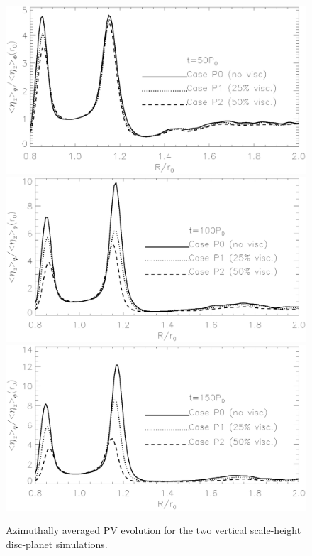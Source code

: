 \begin{figure}
  \centering
  \includegraphics[width=\linewidth,clip=true,trim=0cm 1.66cm 0cm
    0.6cm]{figures/pdisk_vorten1d_cases_005.ps}\\\includegraphics[width=\linewidth,clip=true,trim=0cm
    1.66cm 0cm
    0.6cm]{figures/pdisk_vorten1d_cases_010.ps}\\\includegraphics[width=\linewidth,clip=true,trim=0cm
    0cm 0cm 0.6cm]{figures/pdisk_vorten1d_cases_015.ps} 
  \caption{Azimuthally averaged PV evolution for the two vertical
    scale-height disc-planet simulations. 
    \label{planet_gap_PV}}
\end{figure}

